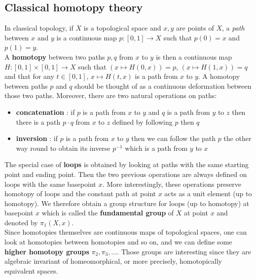 \documentclass{report}
\begin{document}
\subsection{Classical homotopy theory}
In classical topology, if $X$ is a topological space and $x,y$ are points of $X$, a \textit{path} between $x$ and $y$ is a continuous map $p : [0,1] \rightarrow X$ such that $p(0)=x$ and $p(1)=y$.\\
A \textbf{homotopy} between two paths $p,q$ from $x$ to $y$ is then a continuous map $H : [0,1] \times [0,1] \rightarrow X$ such that $(x \mapsto H(0,x) )= p$, $(x \mapsto H(1,x)) = q$ and that for any $t \in [0,1]$, $x\mapsto H(t,x)$ is a path from $x$ to $y$. A homotopy between paths $p$ and $q$ should be thought of as a continuous deformation between those two paths. Moreover, there are two natural operations on paths:
\begin{itemize}
    \item \textbf{concatenation} : if $p$ is a path from $x$ to $y$ and $q$ is a path from $y$ to $z$ then there is a path $p \cdot q$ from $x$ to $z$ defined by following $p$ then $q$
    \item \textbf{inversion} : if $p$ is a path from $x$ to $y$ then we can follow the path $p$ the other way round to obtain its inverse $p^{-1}$ which is a path from $y$ to $x$
\end{itemize}
The special case of \textbf{loops} is obtained by looking at paths with the same starting point and ending point. Then the two previous operations are always defined on loops with the same basepoint $x$. More interestingly, these operations preserve homotopy of loops and the constant path at point $x$ acts as a unit element (up to homotopy).
We therefore obtain a group structure for loops (up to homotopy) at basepoint $x$ which is called the \textbf{fundamental group} of $X$ at point $x$ and denoted by $\pi_1(X,x)$.\\
Since homotopies themselves are continuous maps of topological spaces, one can look at homotopies between homotopies and so on, and we can define some \textbf{higher homotopy groups} $\pi_2,\pi_3,\ldots$. Those groups are interesting since they are algebraic invariant of homeomorphical, or more precisely, homotopically equivalent spaces.
\end{document}
